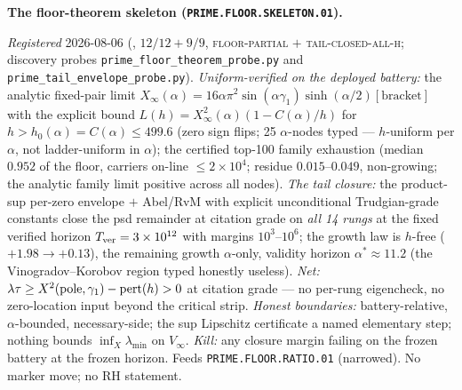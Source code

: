 \par\smallskip\noindent\textbf{The floor-theorem skeleton
(\texttt{PRIME.FLOOR.SKELETON.01}).}
{\sloppy
\emph{Registered} 2026-08-06
(, $12/12 + 9/9$,
\textsc{floor-partial} $+$ \textsc{tail-closed-all-h}; discovery
probes \texttt{prime\_floor\_theorem\_probe.py} and
\texttt{prime\_tail\_envelope\_probe.py}).  \emph{Uniform-verified
on the deployed battery:} the analytic fixed-pair limit
$X_\infty(\alpha) = 16\alpha\pi^2\sin(\alpha\gamma_1)
\sinh(\alpha/2)[\text{bracket}]$ with the explicit bound $L(h) =
X_\infty^2(\alpha)(1 - C(\alpha)/h)$ for $h > h_0(\alpha) =
C(\alpha)\le499.6$ (zero sign flips; 25 $\alpha$-nodes typed ---
$h$-uniform per $\alpha$, not ladder-uniform in $\alpha$); the
certified top-100 family exhaustion (median $0.952$ of the floor,
carriers on-line $\le2\times10^4$; residue $0.015$--$0.049$,
non-growing; the analytic family limit positive across all
nodes).  \emph{The tail closure:} the product-sup per-zero
envelope $+$ Abel/RvM with explicit unconditional Trudgian-grade
constants close the psd remainder at citation grade on
\emph{all 14 rungs} at the fixed verified horizon
$T_{\rm ver}=3\times10^{12}$ with margins $10^3$--$10^6$; the
growth law is $h$-free ($+1.98\to+0.13$), the remaining growth
$\alpha$-only, validity horizon $\alpha^*\approx11.2$ (the
Vinogradov--Korobov region typed honestly useless).  \emph{Net:}
$\lambda\tau\ge X^2({\rm pole},\gamma_1)-{\rm pert}(h)>0$ at
citation grade --- no per-rung eigencheck, no zero-location input
beyond the critical strip.  \emph{Honest boundaries:}
battery-relative, $\alpha$-bounded, necessary-side; the sup
Lipschitz certificate a named elementary step; nothing bounds
$\inf_X\lambda_{\min}$ on $V_\infty$.  \emph{Kill:} any closure
margin failing on the frozen battery at the frozen horizon.
Feeds \texttt{PRIME.FLOOR.RATIO.01} (narrowed).  No marker move;
no RH statement.\par}


